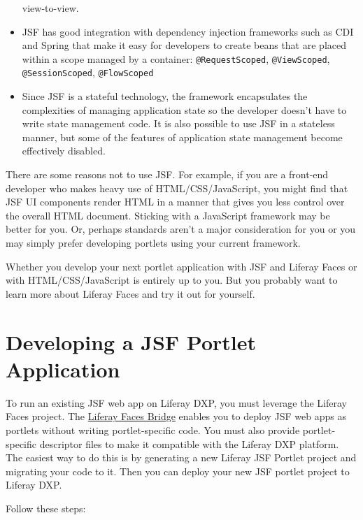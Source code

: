 \begin{itemize}
  view-to-view.
\item
  JSF has good integration with dependency injection frameworks such as
  CDI and Spring that make it easy for developers to create beans that
  are placed within a scope managed by a container:
  \texttt{@RequestScoped}, \texttt{@ViewScoped},
  \texttt{@SessionScoped}, \texttt{@FlowScoped}
\item
  Since JSF is a stateful technology, the framework encapsulates the
  complexities of managing application state so the developer doesn't
  have to write state management code. It is also possible to use JSF in
  a stateless manner, but some of the features of application state
  management become effectively disabled.
\end{itemize}

There are some reasons not to use JSF. For example, if you are a
front-end developer who makes heavy use of HTML/CSS/JavaScript, you
might find that JSF UI components render HTML in a manner that gives you
less control over the overall HTML document. Sticking with a JavaScript
framework may be better for you. Or, perhaps standards aren't a major
consideration for you or you may simply prefer developing portlets using
your current framework.

Whether you develop your next portlet application with JSF and Liferay
Faces or with HTML/CSS/JavaScript is entirely up to you. But you
probably want to learn more about Liferay Faces and try it out for
yourself.

\chapter{Developing a JSF Portlet
Application}\label{developing-a-jsf-portlet-application}

To run an existing JSF web app on Liferay DXP, you must leverage the
Liferay Faces project. The
\href{/docs/7-2/reference/-/knowledge_base/r/understanding-liferay-faces-bridge}{Liferay
Faces Bridge} enables you to deploy JSF web apps as portlets without
writing portlet-specific code. You must also provide portlet-specific
descriptor files to make it compatible with the Liferay DXP platform.
The easiest way to do this is by generating a new Liferay JSF Portlet
project and migrating your code to it. Then you can deploy your new JSF
portlet project to Liferay DXP.

Follow these steps:

